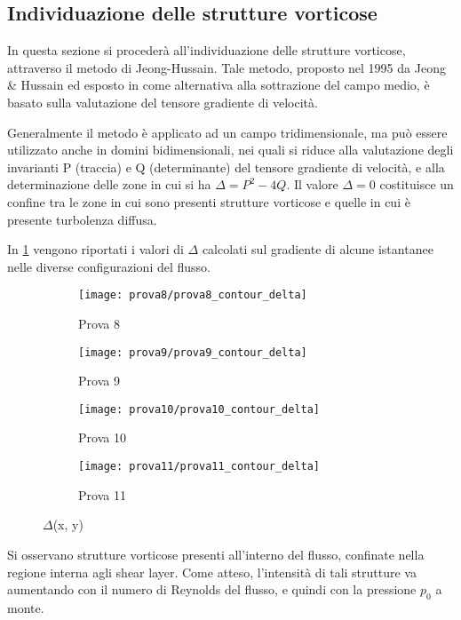 \documentclass{article} %
\begin{document}
\subsection{Individuazione delle strutture vorticose}
In questa sezione si procederà all'individuazione delle strutture vorticose, attraverso il metodo di Jeong-Hussain. Tale metodo, proposto nel 1995 da Jeong \& Hussain ed esposto in \cite{jeong95} come alternativa alla sottrazione del campo medio, è basato sulla valutazione del tensore gradiente di velocità.\par
Generalmente il metodo è applicato ad un campo tridimensionale, ma può essere utilizzato anche in domini bidimensionali, nei quali si riduce alla valutazione degli invarianti P (traccia) e Q (determinante) del tensore gradiente di velocità, e alla determinazione delle zone in cui si ha $\Delta = P^{2} - 4Q$. Il valore $\Delta = 0$ costituisce un confine tra le zone in cui sono presenti strutture vorticose e quelle in cui è presente turbolenza diffusa.\par
In \cref{fig:contour_delta_8901} vengono riportati i valori di $\Delta$ calcolati sul gradiente di alcune istantanee nelle diverse configurazioni del flusso.
\begin{figure}[h!]
	\centering
	\begin{subfigure}[b]{0.24\textwidth}
		\texttt{[image: prova8/prova8\_contour\_delta]}
		\caption{Prova 8}
	\end{subfigure}
	\begin{subfigure}[b]{0.24\textwidth}
		\texttt{[image: prova9/prova9\_contour\_delta]}
		\caption{Prova 9}
	\end{subfigure}
	\begin{subfigure}[b]{0.24\textwidth}
		\texttt{[image: prova10/prova10\_contour\_delta]}
		\caption{Prova 10}
	\end{subfigure}
	\begin{subfigure}[b]{0.24\textwidth}
		\texttt{[image: prova11/prova11\_contour\_delta]}
		\caption{Prova 11}
	\end{subfigure}
	\caption{$\Delta$(x, y)}
	\label{fig:contour_delta_8901}
\end{figure}
Si osservano strutture vorticose presenti all'interno del flusso, confinate nella regione interna agli shear layer. Come atteso, l'intensità di tali strutture va aumentando con il numero di Reynolds del flusso, e quindi con la pressione $p_0$ a monte.
\end{document}
